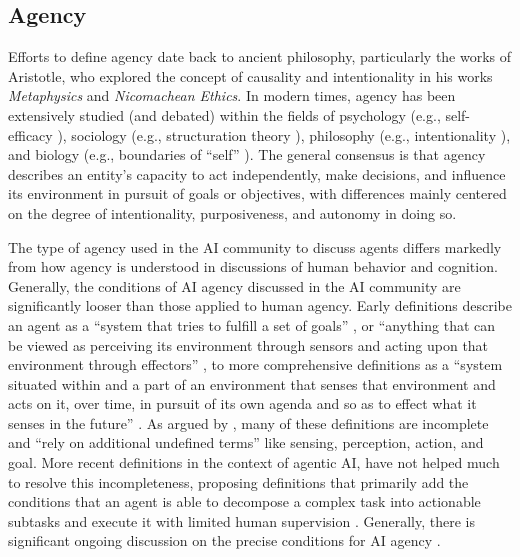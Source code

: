 \documentclass{article}
\theoremstyle{plain}
\theoremstyle{definition}
\theoremstyle{remark}
\begin{document}
\subsection{Agency}

Efforts to define agency date back to ancient philosophy, particularly the works of Aristotle, who explored the concept of causality and intentionality in his works \emph{Metaphysics} and \emph{Nicomachean Ethics}. In modern times, agency has been extensively studied (and debated) within the fields of psychology (e.g., self-efficacy \cite{bandura1982self,bandura2001social}), sociology (e.g., structuration theory \cite{giddens1984constitution}), philosophy (e.g., intentionality \cite{dennett1989intentional}), and biology (e.g., boundaries of ``self'' \cite{levin2019computational, fields2022competency}). The general consensus is that agency describes an entity's capacity to act independently, make decisions, and influence its environment in pursuit of goals or objectives, with differences mainly centered on the degree of intentionality, purposiveness, and autonomy in doing so.


The type of agency used in the AI community to discuss agents differs markedly from how agency is understood in discussions of human behavior and cognition. Generally, the conditions of AI agency discussed in the AI community are significantly looser than those applied to human agency. Early definitions describe an agent as a ``system that tries to fulfill a set of goals'' \cite{maes1993modeling}, or ``anything that can be viewed as perceiving its environment through sensors and acting upon that environment through effectors'' \cite{russell1995artificial}, to more comprehensive definitions as a ``system situated within and a part of an environment that senses that environment and acts on it, over time, in pursuit of its own agenda and so as to effect what it senses in the future'' \cite{franklin1996agent}. As argued by \cite{barandiaran2009defining}, many of these definitions are incomplete and ``rely on additional undefined terms'' like sensing, perception, action, and goal. More recent definitions in the context of agentic AI, have not helped much to resolve this incompleteness, proposing definitions that primarily add the conditions that an agent is able to decompose a complex task into actionable subtasks and execute it with limited human supervision \cite{shavit2023practices,chan2023harms,bansal2024challenges,wiesinger2025agents,mitchell2025agents}. Generally, there is significant ongoing discussion on the precise conditions for AI agency \cite{barandiaran2024transforming,rouleau2024discussions}.
\end{document}

